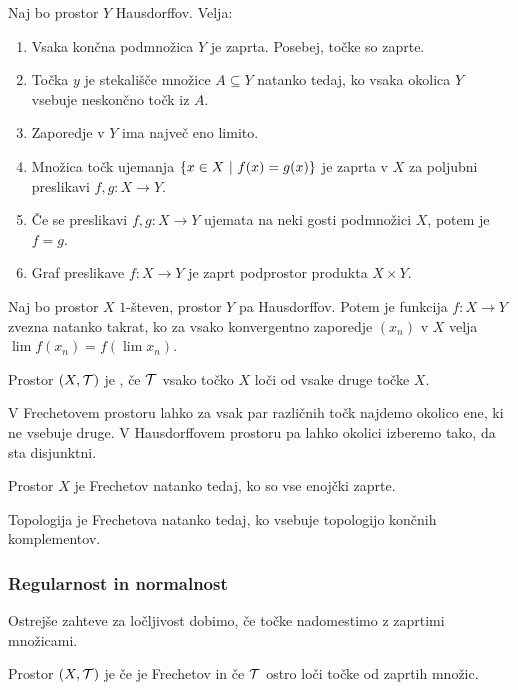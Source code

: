 \begin{izrek}
    Naj bo prostor $Y$ Hausdorffov. Velja:
    \begin{enumerate}
        \item Vsaka končna podmnožica $Y$ je zaprta. Posebej, točke so zaprte.
        \item Točka $y$ je stekališče množice $A \subseteq Y$ natanko tedaj, ko vsaka okolica $Y$ vsebuje neskončno točk iz $A$.
        \item Zaporedje v $Y$ ima največ eno limito.
        \item Množica točk ujemanja $\left\{x \in X \ | \ f(x) = g(x)\right\}$ je zaprta v $X$ za poljubni preslikavi $f, g: X \to Y$.
        \item Če se preslikavi $f, g: X \to Y$ ujemata na neki gosti podmnožici $X$, potem je $f = g$.
        \item Graf preslikave $f: X \to Y$ je zaprt podprostor produkta $X \times Y$.
    \end{enumerate}
\end{izrek}

\begin{izrek}
    Naj bo prostor $X$ $1$-števen, prostor $Y$ pa Hausdorffov. Potem je funkcija $f: X \to Y$ zvezna natanko takrat, ko za vsako konvergentno zaporedje $(x_n)$ v $X$ velja $\lim f(x_n) = f(\lim x_n)$.
\end{izrek}

\begin{definicija}
    Prostor $(X, \mathcal{T})$ je , če $\mathcal{T}$ vsako točko $X$ loči od vsake druge točke $X$.
\end{definicija}

\begin{opomba}
    V Frechetovem prostoru lahko za vsak par različnih točk najdemo okolico ene, ki ne vsebuje druge. V Hausdorffovem prostoru pa lahko okolici izberemo tako, da sta disjunktni.
\end{opomba}

\begin{trditev}
    Prostor $X$ je Frechetov natanko tedaj, ko so vse enojčki zaprte.
\end{trditev}

\begin{opomba}
    Topologija je Frechetova natanko tedaj, ko vsebuje topologijo končnih komplementov.
\end{opomba}

\subsubsection{Regularnost in normalnost}
Ostrejše zahteve za ločljivost dobimo, če točke nadomestimo z zaprtimi množicami.
\begin{definicija}
    Prostor $(X, \mathcal{T})$ je  če je Frechetov in če $\mathcal{T}$ ostro loči točke od zaprtih množic.
\end{definicija}

